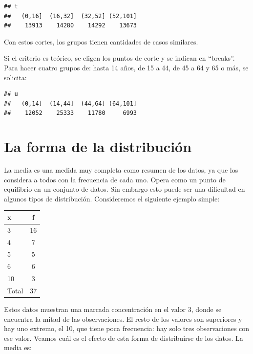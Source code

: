 \documentclass[]{book}
\newenvironment{Shaded}{\begin{snugshade}}{\end{snugshade}}
\newcommand{\DataTypeTok}[1]{\textcolor[rgb]{0.13,0.29,0.53}{#1}}
\newcommand{\DecValTok}[1]{\textcolor[rgb]{0.00,0.00,0.81}{#1}}
\newcommand{\FloatTok}[1]{\textcolor[rgb]{0.00,0.00,0.81}{#1}}
\newcommand{\KeywordTok}[1]{\textcolor[rgb]{0.13,0.29,0.53}{\textbf{#1}}}
\newcommand{\NormalTok}[1]{#1}
\newcommand{\OperatorTok}[1]{\textcolor[rgb]{0.81,0.36,0.00}{\textbf{#1}}}
\newcommand{\StringTok}[1]{\textcolor[rgb]{0.31,0.60,0.02}{#1}}
\begin{document}
\begin{verbatim}
## t
##   (0,16]  (16,32]  (32,52] (52,101] 
##    13913    14280    14292    13673
\end{verbatim}

Con estos cortes, los grupos tienen cantidades de casos similares.

Si el criterio es teórico, se eligen los puntos de corte y se indican en ``breaks''. Para hacer cuatro grupos de: hasta 14 años, de 15 a 44, de 45 a 64 y 65 o más, se solicita:

\begin{Shaded}
\end{Shaded}

\begin{verbatim}
## u
##   (0,14]  (14,44]  (44,64] (64,101] 
##    12052    25333    11780     6993
\end{verbatim}

\hypertarget{la-forma-de-la-distribucion}{%
\section{La forma de la distribución}\label{la-forma-de-la-distribucion}}

La media es una medida muy completa como resumen de los datos, ya que
los considera a todos con la frecuencia de cada uno. Opera como un punto
de equilibrio en un conjunto de datos. Sin embargo esto puede ser una
dificultad en algunos tipos de distribución. Consideremos el siguiente
ejemplo simple:

\begin{longtable}[]{@{}lc@{}}
\toprule
x & f\tabularnewline
\midrule
\endhead
3 & 16\tabularnewline
4 & 7\tabularnewline
5 & 5\tabularnewline
6 & 6\tabularnewline
10 & 3\tabularnewline
Total & 37\tabularnewline
\bottomrule
\end{longtable}

Estos datos muestran una marcada concentración en el valor 3, donde se
encuentra la mitad de las observaciones. El resto de los valores son
superiores y hay uno extremo, el 10, que tiene poca frecuencia: hay solo
tres observaciones con ese valor. Veamos cuál es el efecto de esta forma
de distribuirse de los datos. La media es:
\end{document}
